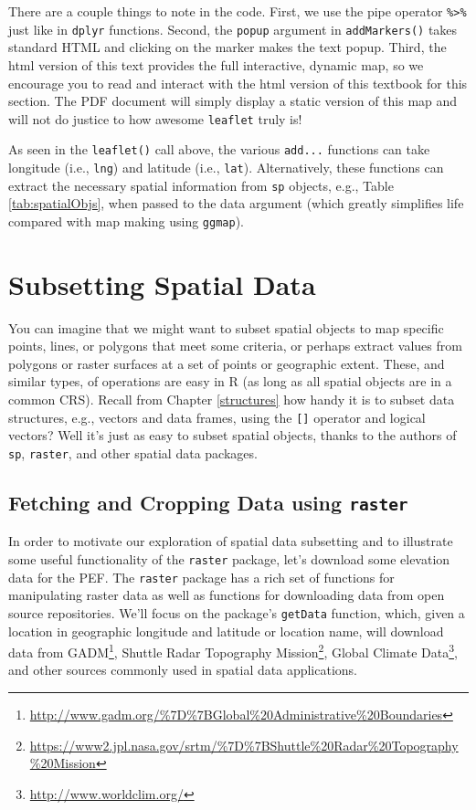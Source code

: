 \documentclass[]{krantz}
\renewcommand{\href}[2]{#2\footnote{\url{#1}}}
\begin{document}
\hypertarget{htmlwidget-4b2ba1852a569edfcbe7}{}

There are a couple things to note in the code. First, we use the pipe
operator \texttt{\%\textgreater{}\%} just like in \texttt{dplyr}
functions. Second, the \texttt{popup} argument in \texttt{addMarkers()}
takes standard HTML and clicking on the marker makes the text popup.
Third, the html version of this text provides the full interactive,
dynamic map, so we encourage you to read and interact with the html
version of this textbook for this section. The PDF document will simply
display a static version of this map and will not do justice to how
awesome \texttt{leaflet} truly is!

As seen in the \texttt{leaflet()} call above, the various
\texttt{add...} functions can take longitude (i.e., \texttt{lng}) and
latitude (i.e., \texttt{lat}). Alternatively, these functions can
extract the necessary spatial information from \texttt{sp} objects,
e.g., Table \ref{tab:spatialObjs}, when passed to the data argument
(which greatly simplifies life compared with map making using
\texttt{ggmap}).

\section{Subsetting Spatial Data}\label{subsetting-spatial-data}

You can imagine that we might want to subset spatial objects to map
specific points, lines, or polygons that meet some criteria, or perhaps
extract values from polygons or raster surfaces at a set of points or
geographic extent. These, and similar types, of operations are easy in R
(as long as all spatial objects are in a common CRS). Recall from
Chapter \ref{structures} how handy it is to subset data structures,
e.g., vectors and data frames, using the \texttt{{[}{]}} operator and
logical vectors? Well it's just as easy to subset spatial objects,
thanks to the authors of \texttt{sp}, \texttt{raster}, and other spatial
data packages.

\subsection{\texorpdfstring{Fetching and Cropping Data using
\texttt{raster}}{Fetching and Cropping Data using raster}}\label{fetching-and-cropping-data-using-raster}

In order to motivate our exploration of spatial data subsetting and to
illustrate some useful functionality of the \texttt{raster} package,
let's download some elevation data for the PEF. The \texttt{raster}
package has a rich set of functions for manipulating raster data as well
as functions for downloading data from open source repositories. We'll
focus on the package's \texttt{getData} function, which, given a
location in geographic longitude and latitude or location name, will
download data from
\href{http://www.gadm.org/\%7D\%7BGlobal\%20Administrative\%20Boundaries}{GADM},
\href{https://www2.jpl.nasa.gov/srtm/\%7D\%7BShuttle\%20Radar\%20Topography\%20Mission}{Shuttle
Radar Topography Mission}, \href{http://www.worldclim.org/}{Global
Climate Data}, and other sources commonly used in spatial data
applications.
\end{document}
